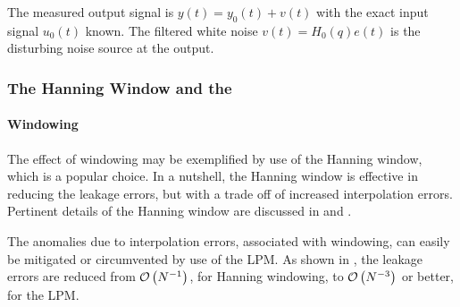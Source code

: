 \begin{assumption}
The measured output signal is $y(t) = y_0(t) + v(t)$ with the exact input signal $u_0(t)$ known. 
The filtered white noise $v(t) = H_0(q)e(t)$ is the disturbing noise source at the output.
\end{assumption}


\subsubsection{The Hanning Window and the }
\label{sec:nparam:trunc:LPMFRFest}
\paragraph{Windowing}
The effect of windowing may be  exemplified by use of the Hanning window, which is a popular choice.
In a nutshell, the Hanning window is effective in reducing  the leakage errors, but  with a trade off of increased interpolation errors. 
Pertinent details of the Hanning window are discussed in \citep{Schoukens2006LPM,Antoni2007FRF,Schoukens2009LPM,Wellstead1981} and \citep{Harris1978}.

The anomalies due to interpolation errors, associated with windowing, can easily be mitigated or circumvented by use of the \gls{LPM}. 
As shown in \citep{Pintelon2012}, the leakage errors are reduced from  $\mathcal{O} \left( {N}^{-1} \right)$, for Hanning windowing, to $\mathcal{O} \left( {N}^{-3} \right)$ or better, for the \gls{LPM}.




